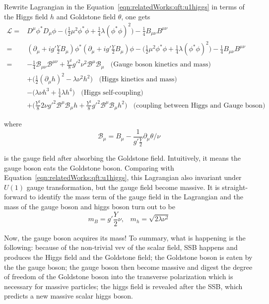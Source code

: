 \noindent Rewrite Lagrangian in the Equation~\ref{eqn:relatedWorks:qft:u1higgs} in terms of the Higgs field $h$ and Goldstone field $\theta$, one gets
\begin{equation}
\begin{split}
    \mathcal{L} =&  D^\mu\phi^* D_\mu\phi- \big(\frac{1}{2} \mu^2 \phi^*\phi + \frac{1}{4} \lambda(\phi^*\phi )^2 \big)   - \frac{1}{4}B_{\mu\nu}B^{\mu\nu} \\
    =&  (\partial_\mu +i g' \frac{Y}{2} B_\mu) \phi^* (\partial_\mu +i g' \frac{Y}{2} B_\mu) \phi- \big(\frac{1}{2} \mu^2 \phi^*\phi + \frac{1}{4} \lambda(\phi^*\phi )^2 \big)   - \frac{1}{4}B_{\mu\nu}B^{\mu\nu} \\
    =&  - \frac{1}{4}\mathcal{B}_{\mu\nu}\mathcal{B}^{\mu\nu} +  \frac{Y^2}{8} g'^2 \nu^2\mathcal{B}^\mu \mathcal{B}_\mu \;\; \text{ (Gauge boson kinetics and mass) } \\
    & + \big(\frac{1}{2} (\partial_\mu h)^2 -\lambda\nu^2h^2\big)  \;\; \text{ (Higgs kinetics and mass) }\\
    & - \big ( \lambda \nu h^3 + \frac{1}{4}\lambda h^4 \big) \;\; \text{ (Higgs self-coupling) } \\
    & + \big( \frac{Y^2}{8} 2\nu g'^2 \mathcal{B}^\mu \mathcal{B}_\mu h  + \frac{Y^2}{8} g'^2  \mathcal{B}^\mu \mathcal{B}_\mu h^2 \big)   \;\; \text{ (coupling between Higgs and Gauge boson) }
\end{split}
\end{equation}

\noindent where
\begin{equation}
    \mathcal{B}_\mu = B_\mu - \frac{1}{g'\frac{Y}{2}} \partial_\mu \theta/\nu
\end{equation}

\noindent is the gauge field after absorbing the Goldstone field. Intuitively, it means the gauge boson eats the Goldstone boson. Comparing with Equation~\ref{eqn:relatedWorks:qft:u1higgs}, this Lagrangian also invariant under $U(1)$ gauge transformation, but the gauge field become massive. It is straight-forward to identify the mass term of the gauge field in the Lagrangian and the mass of the gauge boson and higgs boson turn out to be
\begin{equation}
    m_B = g'\frac{Y}{2} \nu ,\;\;\; 
    m_h = \sqrt{2\lambda\nu^2}
\end{equation}

\noindent Now, the gauge boson acquires its mass! To summary, what is happening is the following: because of the non-trivial vev of the scalar field, SSB happens and produces the Higgs field and the Goldstone field; the Goldstone boson is eaten by the the gauge boson; the gauge boson then become massive and digest the degree of freedom of the Goldstone boson into the transverse polarization which is necessary for massive particles; the higgs field is revealed after the SSB, which predicts a new massive scalar higgs boson.


